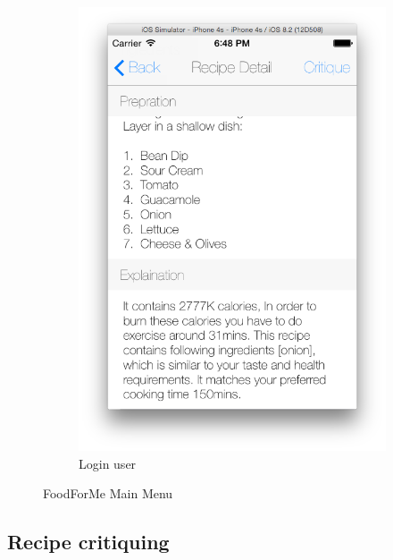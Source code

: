 \begin{figure}[h]
\begin{subfigure}{.49\textwidth}
		\includegraphics[width=.9\linewidth]{figures/ch4_app_screen_shots/recipe_detail/recommended_recipe_explaination/recommended_recipe_explaination_2.png}
		\caption{Login user}
	\end{subfigure}
	\caption{FoodForMe Main Menu}
	\label{fig:foodforme_main_menu_sreen}
\end{figure}


\subsection{Recipe critiquing} 
%


